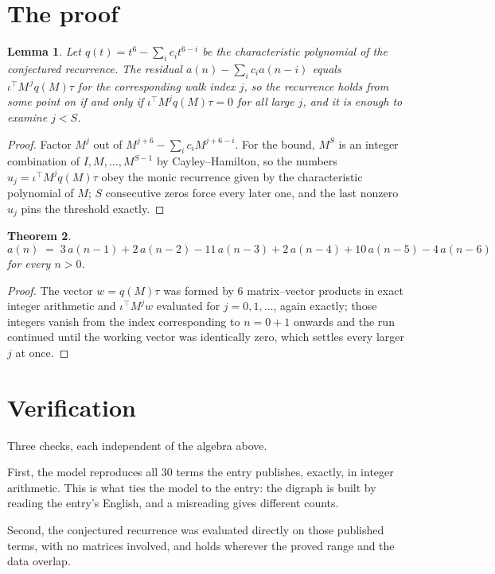 \documentclass[11pt,a4paper]{article}
\theoremstyle{plain}
\newtheorem{theorem}{Theorem}
\newtheorem{lemma}[theorem]{Lemma}
\theoremstyle{definition}
\begin{document}
\section{The proof}

\begin{lemma}\label{lem:crit}
Let $q(t)=t^{6}-\sum_i c_it^{6-i}$ be the characteristic polynomial of the
conjectured recurrence. The residual $a(n)-\sum_ic_ia(n-i)$ equals
$\iota^{\!\top}M^{\,j}q(M)\tau$ for the corresponding walk index $j$, so the recurrence
holds from some point on if and only if $\iota^{\!\top}M^{j}q(M)\tau=0$ for all large $j$,
and it is enough to examine $j<S$.
\end{lemma}

\begin{proof}
Factor $M^{j}$ out of $M^{j+6}-\sum_ic_iM^{j+6-i}$. For the bound, $M^{S}$
is an integer combination of $I,M,\dots,M^{S-1}$ by Cayley--Hamilton, so the numbers
$u_j=\iota^{\!\top}M^{j}q(M)\tau$ obey the monic recurrence given by the characteristic
polynomial of $M$; $S$ consecutive zeros force every later one, and the last nonzero $u_j$
pins the threshold exactly.
\end{proof}

\begin{theorem}
\[
a(n)\;=\;3\,a(n-1) + 2\,a(n-2) - 11\,a(n-3) + 2\,a(n-4) + 10\,a(n-5) - 4\,a(n-6)
\]
for every $n>0$.
\end{theorem}

\begin{proof}
The vector $w=q(M)\tau$ was formed by $6$ matrix--vector products in exact integer
arithmetic and $\iota^{\!\top}M^{j}w$ evaluated for $j=0,1,\dots$, again exactly; those
integers vanish from the index corresponding to $n=0+1$ onwards and the run continued
until the working vector was identically zero, which settles every larger $j$ at once.
\end{proof}

\section{Verification}

Three checks, each independent of the algebra above.

First, the model reproduces all $30$ terms the entry publishes, exactly, in integer
arithmetic. This is what ties the model to the entry: the digraph is built by reading the
entry's English, and a misreading gives different counts.

Second, the conjectured recurrence was evaluated directly on those published terms, with no
matrices involved, and holds wherever the proved range and the data overlap.
\end{document}
